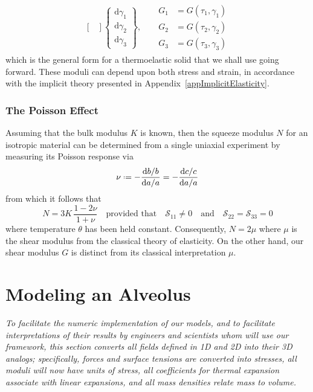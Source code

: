 \begin{subequations}
\begin{align}
\begin{bmatrix}
    \end{bmatrix} \left\{ \begin{matrix}
    \mathrm{d} \gamma_1 \\ \mathrm{d} \gamma_2 \\ \mathrm{d} \gamma_3
    \end{matrix} \right\}, & & 
    \begin{aligned}
    G_1 & = G ( \tau_1 , \gamma_1 ) \\
    G_2 & = G ( \tau_2 , \gamma_2 ) \\
    G_3 & = G ( \tau_3 , \gamma_3 )
    \end{aligned}
    \label{HelmholtzODEsShear}
    \end{align}
\end{subequations}
which is the general form for a thermo\-elastic solid that we shall use going forward. These moduli can depend upon both stress and strain, in accordance with the implicit theory presented in Appendix~\ref{appImplicitElasticity}.

\subsubsection{The Poisson Effect}

Assuming that the bulk modulus $K$ is known, then the squeeze modulus $N$ for an isotropic material can be determined from a single uniaxial experiment by measuring its Poisson response via
\begin{displaymath}
\nu \defeq - \frac{\mathrm{d}b / b}{\mathrm{d}a / a} = 
- \frac{\mathrm{d} c / c}{\mathrm{d}a / a}
\end{displaymath}
from which it follows that
\begin{displaymath}
N = 3K \, \frac{1 - 2\nu}{1 + \nu}
\quad \text{provided that} \quad
\mathcal{S}_{11} \neq 0 
\quad \text{and} \quad
\mathcal{S}_{22} = \mathcal{S}_{33} = 0 
\end{displaymath}
where temperature $\theta$ has been held constant.  Consequently, $N = 2\mu$ where $\mu$ is the shear modulus from the classical theory of elasticity.  On the other hand, our shear modulus $G$ is distinct from its classical interpretation $\mu$.

\section{Modeling an Alveolus}
\label{secAlveolus}

\textit{To facilitate the numeric implementation of our models, and to facilitate interpretations of their results by engineers and scientists whom will use our framework, this section converts all fields defined in 1D and 2D into their 3D analogs; specifically, forces and surface tensions are converted into stresses, all moduli will now have units of stress, all coefficients for thermal expansion associate with linear expansions, and all mass densities relate mass to volume.}


